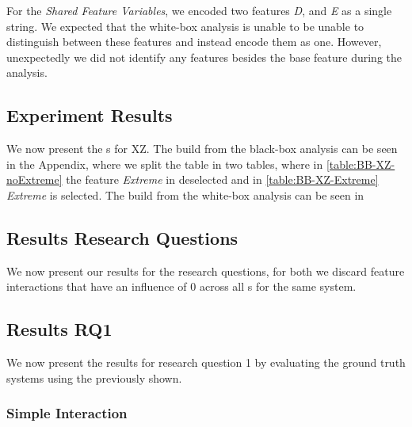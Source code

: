 For the \emph{Shared Feature Variables}, we encoded two features \emph{D}, and \emph{E} as a single string. We expected that the white-box analysis is unable
to be unable to distinguish between these features and instead encode them as one. 
However, unexpectedly we did not identify any features besides the base feature during the analysis.

\subsection{Experiment Results}

We now present the {\perfInfluenceModel}s for \textsc{XZ}. The {\perfInfluenceModel} build from the black-box analysis can be seen
in the Appendix, where we split the table in two tables, where in \autoref{table:BB-XZ-noExtreme} the feature \emph{Extreme} in 
deselected and in \autoref{table:BB-XZ-Extreme} \emph{Extreme} is selected. The {\perfInfluenceModel} build from the white-box analysis 
can be seen in %

\subsection{Results Research Questions}
We now present our results for the research questions, for both we discard feature interactions that have an influence of 0 
across all {\perfInfluenceModel}s for the same system.

\subsection*{Results RQ1}

We now present the results for research question 1 by evaluating the ground truth systems using the {\perfInfluenceModel} previously
shown.

\subsubsection*{Simple Interaction}

